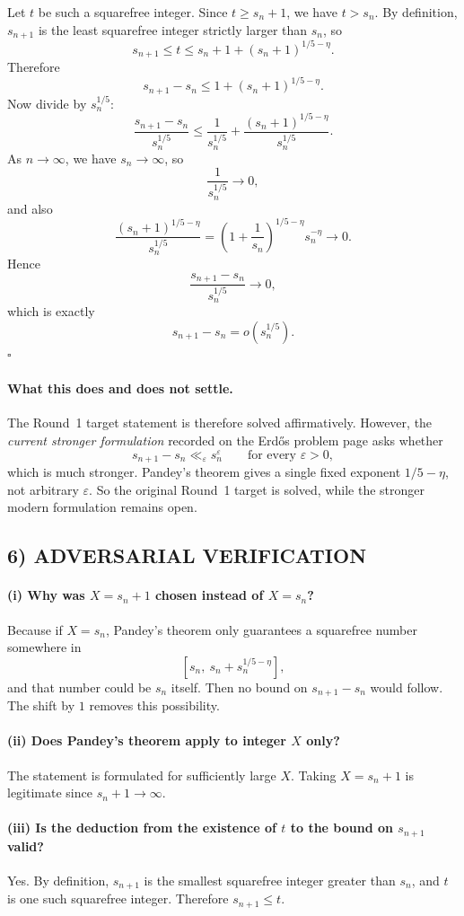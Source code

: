Let $t$ be such a squarefree integer. Since $t\ge s_n+1$, we have $t>s_n$. By definition, $s_{n+1}$ is the least squarefree integer strictly larger than $s_n$, so
\[
s_{n+1}\le t\le s_n+1+(s_n+1)^{1/5-\eta}.
\]
Therefore
\[
s_{n+1}-s_n\le 1+(s_n+1)^{1/5-\eta}.
\]
Now divide by $s_n^{1/5}$:
\[
\frac{s_{n+1}-s_n}{s_n^{1/5}}
\le
\frac{1}{s_n^{1/5}}
+
\frac{(s_n+1)^{1/5-\eta}}{s_n^{1/5}}.
\]
As $n\to\infty$, we have $s_n\to\infty$, so
\[
\frac{1}{s_n^{1/5}}\to 0,
\]
and also
\[
\frac{(s_n+1)^{1/5-\eta}}{s_n^{1/5}}
=
\left(1+\frac{1}{s_n}\right)^{1/5-\eta}s_n^{-\eta}\to 0.
\]
Hence
\[
\frac{s_{n+1}-s_n}{s_n^{1/5}}\to 0,
\]
which is exactly
\[
s_{n+1}-s_n=o(s_n^{1/5}).
\]
\hfill $\square$

\paragraph{What this does and does not settle.}
The Round~1 target statement is therefore solved affirmatively. However, the \emph{current stronger formulation} recorded on the Erd\H{o}s problem page asks whether
\[
s_{n+1}-s_n\ll_\varepsilon s_n^\varepsilon
\qquad\text{for every }\varepsilon>0,
\]
which is much stronger. Pandey's theorem gives a single fixed exponent $1/5-\eta$, not arbitrary $\varepsilon$. So the original Round~1 target is solved, while the stronger modern formulation remains open.

\subsection*{6) ADVERSARIAL VERIFICATION}

\paragraph{(i) Why was $X=s_n+1$ chosen instead of $X=s_n$?}
Because if $X=s_n$, Pandey's theorem only guarantees a squarefree number somewhere in
\[
[s_n,\ s_n+s_n^{1/5-\eta}],
\]
and that number could be $s_n$ itself. Then no bound on $s_{n+1}-s_n$ would follow. The shift by $1$ removes this possibility.

\paragraph{(ii) Does Pandey's theorem apply to integer $X$ only?}
The statement is formulated for sufficiently large $X$. Taking $X=s_n+1$ is legitimate since $s_n+1\to\infty$.

\paragraph{(iii) Is the deduction from the existence of $t$ to the bound on $s_{n+1}$ valid?}
Yes. By definition, $s_{n+1}$ is the smallest squarefree integer greater than $s_n$, and $t$ is one such squarefree integer. Therefore $s_{n+1}\le t$.

